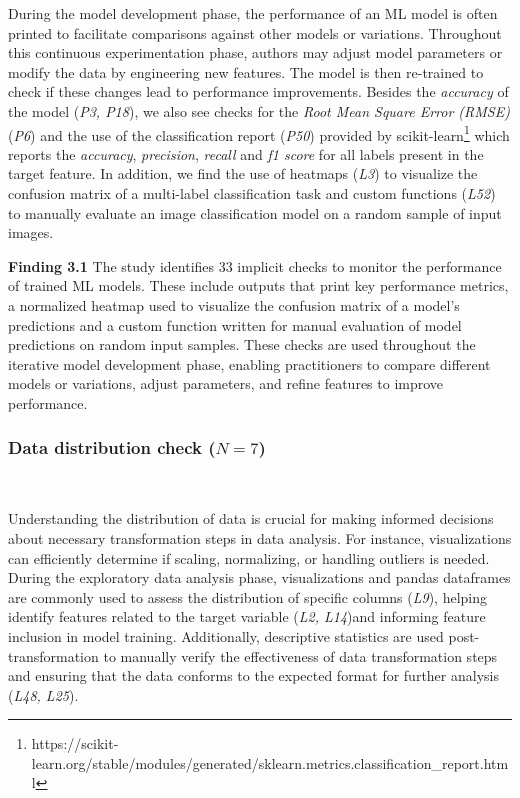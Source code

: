 \documentclass[smallextended]{svjour3}       %
\newcommand{\highlight}[1]{\begin{framed}%
  \noindent#1
\end{framed}}
\begin{document}
During the model development phase, the performance of an ML model is often printed to facilitate comparisons against other models or variations. Throughout this continuous experimentation phase, authors may adjust model parameters or modify the data by engineering new features. The model is then re-trained to check if these changes lead to performance improvements. Besides the \emph{accuracy} of the model (\emph{P3, P18}), we also see checks for the \emph{Root Mean Square Error (RMSE)} (\emph{P6}) and the use of the classification report (\emph{P50}) provided by scikit-learn\footnote{https://scikit-learn.org/stable/modules/generated/sklearn.metrics.classification\_report.html} which reports the \emph{accuracy}, \emph{precision}, \emph{recall} and \emph{f1 score} for all labels present in the target feature. In addition, we find the use of heatmaps (\emph{L3}) to visualize the confusion matrix of a multi-label classification task and custom functions (\emph{L52}) to manually evaluate an image classification model on a random sample of input images.

\highlight{\textbf{Finding 3.1} The study identifies 33 implicit checks to monitor the performance of trained ML models. These include outputs that print key performance metrics, a normalized heatmap used to visualize the confusion matrix of a model's predictions and a custom function written for manual evaluation of model predictions on random input samples. These checks are used throughout the iterative model development phase, enabling practitioners to compare different models or variations, adjust parameters, and refine features to improve performance.}

\subsubsection{Data distribution check ($N = 7$)}~\label{sec:data-distribution-output}

Understanding the distribution of data is crucial for making informed decisions about necessary transformation steps in data analysis. For instance, visualizations can efficiently determine if scaling, normalizing, or handling outliers is needed. During the exploratory data analysis phase, visualizations and pandas dataframes are commonly used to assess the distribution of specific columns (\emph{L9}), helping identify features related to the target variable (\emph{L2, L14})and informing feature inclusion in model training. Additionally, descriptive statistics are used post-transformation to manually verify the effectiveness of data transformation steps and ensuring that the data conforms to the expected format for further analysis (\emph{L48, L25}).
\end{document}
